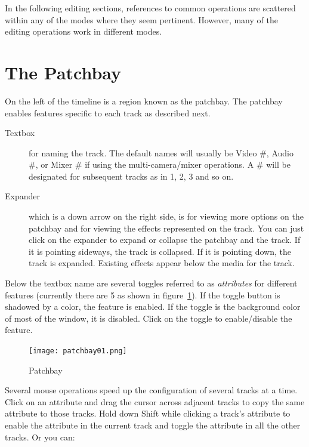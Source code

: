 In the following editing sections, references to common operations
are scattered within any of the modes where they seem pertinent.
However, many of the editing operations work in different modes.


\section{The Patchbay}%
\label{sec:patchbay}

On the left of the timeline is a region known as the patchbay.  The
patchbay enables features specific to each track as described next.


\begin{description}
\item[Textbox] for naming the track.  The default names will usually
  be Video \#, Audio \#, or Mixer \# if using the multi-camera/mixer
  operations.  A \# will be designated for subsequent tracks as in 1,
  2, 3 and so on.
\item[Expander] which is a down arrow on the right side, is for
  viewing more options on the patchbay and for viewing the effects
  represented on the track.  You can just click on the expander to
  expand or collapse the patchbay and the track.  If it is pointing
  sideways, the track is collapsed.  If it is pointing down, the track
  is expanded.  Existing effects appear below the media for the track.
\end{description}

Below the textbox name are several toggles referred to as
\textit{attributes} for different features (currently there are 5 as
shown in figure~\ref{fig:patchbay01}).  If the toggle button is
shadowed by a color, the feature is enabled. If the toggle is the
background color of most of the window, it is disabled. Click on the
toggle to enable/disable the feature.

\begin{figure}
  \vspace{-2ex}
  \centering
  \texttt{[image: patchbay01.png]}
  \caption{Patchbay}
  \label{fig:patchbay01}
\end{figure}

Several mouse operations speed up the configuration of several
tracks at a time. Click on an attribute and drag the cursor across
adjacent tracks to copy the same attribute to those tracks.  Hold
down Shift while clicking a track's attribute to enable the
attribute in the current track and toggle the attribute in all the
other tracks. Or you can:

